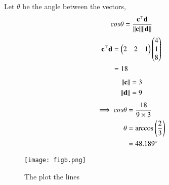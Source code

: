 \documentclass[journal,12pt,twocolumn]{IEEEtran}
\begin{document}
\begin{enumerate}
    Let $\theta$ be the angle between the vectors,
    \begin{align}
        cos\theta = \frac{\mathbf{c}^\top \mathbf{d}}{\lVert\mathbf{c}\rVert {\lVert\mathbf{d}\rVert}}
    \end{align}
    \begin{align}
        \mathbf{c}^\top\mathbf{d}&=\begin{pmatrix}2&2&1\end{pmatrix}\begin{pmatrix}4\\1\\8\end{pmatrix}\\
                           &=18
    \end{align}
    \begin{align}
        \lVert\mathbf{c}\rVert &=3\\
        \lVert\mathbf{d}\rVert &=9
    \end{align}
    \begin{align}
        \implies cos\theta & = \frac{18}{9\times 3}\\
          \theta &= \arccos\left(\frac{2}{3}\right)\\
                 &= 48.189\degree
    \end{align}
   \begin{figure}[!ht]
   \centering
   \texttt{[image: figb.png]}
   \caption{The plot the lines}
   \end{figure}
\end{enumerate}
    
\end{document}
